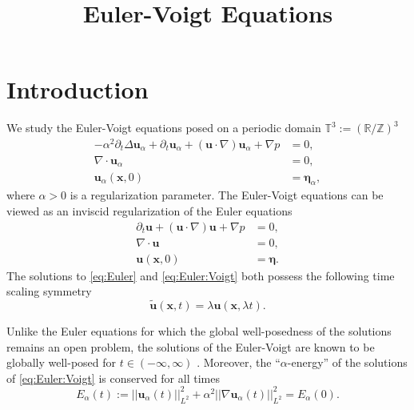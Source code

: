 \documentclass[leqno,10pt,a4paper]{amsart}
\theoremstyle{definition}
\numberwithin{equation}{section}
\newcommand{\mbb}[1]{\mathbb{#1}}
\newcommand{\bds}{\boldsymbol}
\begin{document}
\author[]{}
\address{}
\email{}
\keywords{}
\subjclass[]{}
\title{Euler-Voigt Equations}
\maketitle

\section{Introduction}
\label{sec:intro}

We study the Euler-Voigt equations posed on a periodic domain $\mbb T^3 := (\mbb R/\mbb Z)^3 $
%
\begin{equation}\label{eq:Euler:Voigt}
\begin{aligned}
-\alpha^2 \partial_t\Delta\bds u_\alpha + \partial_t \bds u_\alpha + (\bds u\cdot\nabla)\bds u_\alpha + \nabla p &= 0, \\
\nabla \cdot \bds u_\alpha &= 0, \\
\bds u_\alpha(\bds x, 0) &= \bds \eta_\alpha,
\end{aligned}
\end{equation}
%
where $\alpha > 0$ is a regularization parameter.
The Euler-Voigt equations can be viewed as an inviscid regularization of the Euler equations
%
\begin{equation}\label{eq:Euler}
\begin{aligned}
\partial_t \bds u + (\bds u\cdot\nabla)\bds u + \nabla p &= 0, \\
\nabla \cdot \bds u &= 0, \\
\bds u(\bds x, 0) &= \bds \eta.
\end{aligned}
\end{equation}
%
The solutions to \eqref{eq:Euler} and \eqref{eq:Euler:Voigt} both possess the following time scaling symmetry
%
\begin{equation}\label{eq:sym}
\tilde {\bds u}(\bds x, t) = \lambda\bds u(\bds x, \lambda t).
\end{equation}
%

Unlike the Euler equations for which the global well-posedness of the solutions remains an open problem, the solutions of the Euler-Voigt are known to be globally well-posed for $t \in (-\infty, \infty)$ \cite{CaoLunasinTiti2006}. Moreover, the ``$\alpha$-energy'' of the solutions of  \eqref{eq:Euler:Voigt} is conserved for all times
%
\begin{equation}
E_\alpha(t) := ||\bds u_\alpha(t)||^2_{L^2} + \alpha^2 ||\nabla \bds u_\alpha(t)||_{L^2}^2 = E_\alpha(0). 
\end{equation}
%
\end{document}
